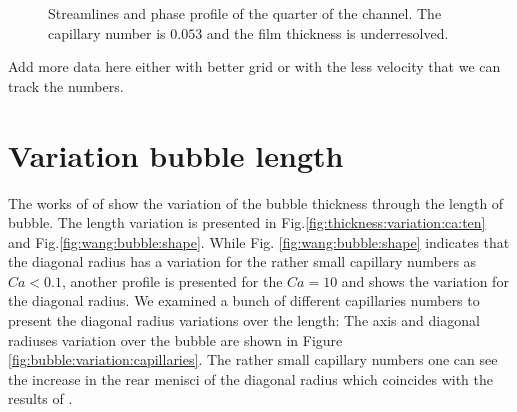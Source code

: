 \documentclass{article}
\begin{document}
\begin{figure}
\caption{Streamlines and phase profile of the quarter of the channel. The capillary number is
$0.053$ and the film thickness is underresolved. \label{fig:quarter:capillary:capillary01}}
\end{figure}
{\color{red} Add more data here either with better grid or with the less velocity that we can
track the numbers.}


\section{Variation bubble length}
The works of \citet{heil-threedim} of \citet{wang-non-circular} show the variation of the bubble
thickness through the length of
bubble. The length variation is presented in Fig.\ref{fig:thickness:variation:ca:ten} and
Fig.\ref{fig:wang:bubble:shape}. While Fig. \ref{fig:wang:bubble:shape} indicates that the diagonal
radius has a variation for the rather small capillary numbers as $Ca<0.1$, another profile is
presented for the $Ca=10$ and shows the variation for the diagonal radius. We examined a bunch of
different capillaries numbers to present the diagonal radius variations over the length:
The axis and diagonal radiuses variation over the bubble are shown in Figure
\ref{fig:bubble:variation:capillaries}. The rather small capillary numbers one can see the increase
in the rear menisci of the diagonal radius which coincides with the results of
\citet{wang-non-circular}.
\end{document}
